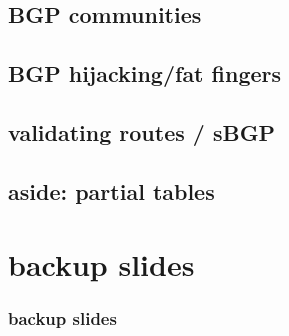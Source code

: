 \subsection{BGP communities}


\subsection{BGP hijacking/fat fingers}


\subsection{validating routes / sBGP}



\subsection{aside: partial tables}




\section{backup slides}
\begin{frame}\frametitle{backup slides}
\end{frame}


